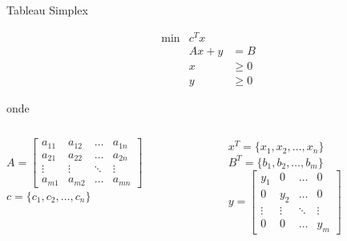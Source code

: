 \documentclass[compress,mathserif]{beamer}
\begin{document}
\begin{frame}{Tableau Simplex}

  $$\begin{matrix}
        \min & c^Tx \\ 
             & Ax + y & = B \\
             & x & \geqslant 0 \\
             & y & \geqslant 0
        \end{matrix}    
$$

onde 
\begin{columns}[T]
    \begin{column}{.49\textwidth}
    \vspace{0.7cm}
    $A = \begin{bmatrix}
a_{11} & a_{12} & \dots & a_{1n}\\ 
a_{21} & a_{22} & \dots & a_{2n}\\ 
\vdots & \vdots & \ddots & \vdots \\ 
a_{m1} & a_{m2} & \dots & a_{mn}
\end{bmatrix}$ \\
\vspace{0.5cm}
$c = \{c_1, c_2, \ldots, c_n\}$ \\
\end{column}
    \begin{column}{.49\textwidth}
    \vspace{0.25cm}
    $x^T = \{x_1, x_2, \ldots, x_n\}$ \\
    \vspace{0.45cm}
    $B^T = \{b_1, b_2, \ldots, b_m\}$ \\
    \vspace{0.45cm}
    $y = \begin{bmatrix}
        y_{1} & 0 & \dots & 0\\ 
        0 & y_{2} & \dots & 0\\ 
        \vdots & \vdots & \ddots & \vdots \\ 
        0 & 0 & \dots & y_{m}
    \end{bmatrix}$
\end{column}
\end{columns}

\end{frame}

\end{document}
